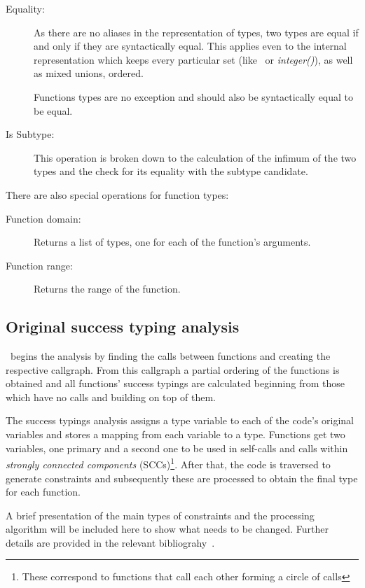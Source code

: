 \begin{description}
\item[Equality:] As there are no aliases in the representation of
  types, two types are equal if and only if they are syntactically
  equal. This applies even to the internal representation which keeps
  every particular set (like \atom\ or \emph{integer()}), as well as
  mixed unions, ordered.

  Functions types are no exception and should also be syntactically
  equal to be equal.

\item[Is Subtype:] This operation is broken down to the calculation of
  the infimum of the two types and the check for its equality with the
  subtype candidate.
\end{description}

There are also special operations for function types:

\begin{description}
\item[Function domain:] Returns a list of types, one for each of the
  function's arguments.
\item[Function range:] Returns the range of the function.
\end{description}

\subsection{Original success typing analysis}
\label{sct:orig_analysis}

\dr\ begins the analysis by finding the calls between functions and
creating the respective callgraph. From this callgraph a partial
ordering of the functions is obtained and all functions' success
typings are calculated beginning from those which have no calls and
building on top of them.

The success typings analysis assigns a type variable to each of the
code's original variables and stores a mapping from each variable to a
type. Functions get two variables, one primary and a second one to be
used in self-calls and calls within \emph{strongly connected
  components} (SCCs)\footnote{These correspond to functions that call
  each other forming a circle of calls}. After that, the code is
traversed to generate constraints and subsequently these are processed
to obtain the final type for each function.

A brief presentation of the main types of constraints and the
processing algorithm will be included here to show what needs to be
changed. Further details are provided in the relevant
bibliograhy~\cite{Elli, SuccessTypings@PPDP-06}.

